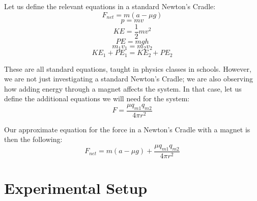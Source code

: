 \documentclass[aip,jmp,amsmath,amssymb,reprint,author-numerical]{revtex4-1}
\begin{document}
        Let us define the relevant equations in a standard Newton's Cradle:
        \begin{equation}
            F_{net}=m(a-\mu g)
        \end{equation}
        \begin{equation}
            p=mv
        \end{equation}
        \begin{equation}
            KE=\frac{1}{2}mv^2
        \end{equation}
        \begin{equation}
            PE=mgh
        \end{equation}
        \begin{equation}
            m_{1}v_{1}=m_{2}v_{2}
        \end{equation}
        \begin{equation}
            KE_{1}+PE_{1}=KE_{2}+PE_{2}
        \end{equation}

        These are all standard equations, taught in physics classes in schools. However, we are not
        just investigating a standard Newton's Cradle; we are also observing how adding energy through
        a magnet affects the system. In that case, let us define the additional equations we will need
        for the system:
        \begin{equation}
            F=\frac{\mu q_{m1}q_{m2}}{4\pi r^2}
        \end{equation}

        Our approximate equation for the force in a Newton's Cradle with a magnet is then the following:
        \begin{equation}
            F_{net}=m(a-\mu g) + \frac{\mu q_{m1}q_{m2}}{4\pi r^2}
        \end{equation}


    \section{\label{sec:expset}Experimental Setup}

\end{document}
